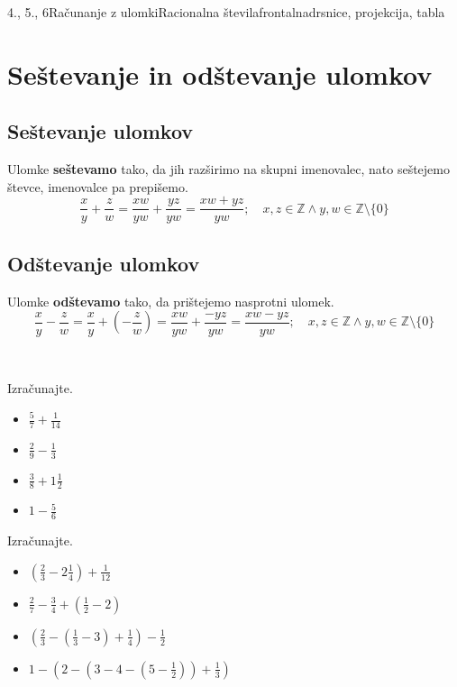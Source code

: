 \begin{priprava}{4., 5., 6}{}{Računanje z ulomki}{Racionalna števila}{frontalna}{drsnice, projekcija, tabla}

    \section{Seštevanje in odštevanje ulomkov}

        
    \subsection*{Seštevanje ulomkov}
        Ulomke \textbf{seštevamo} tako, da jih razširimo na skupni imenovalec, nato seštejemo števce, imenovalce pa prepišemo.
        $$\dfrac{x}{y}+\dfrac{z}{w}=\dfrac{xw}{yw}+\dfrac{yz}{yw}=\dfrac{xw+yz}{yw}; \quad x,z\in\mathbb{Z}\land y,w\in\mathbb{Z}\setminus\{0\} $$
    

    \subsection*{Odštevanje ulomkov}
        Ulomke \textbf{odštevamo} tako, da prištejemo nasprotni ulomek.
        $$\dfrac{x}{y}-\dfrac{z}{w}=\dfrac{x}{y}+\left(-\dfrac{z}{w}\right)=\dfrac{xw}{yw}+\dfrac{-yz}{yw}=\dfrac{xw-yz}{yw}; \quad x,z\in\mathbb{Z}\land y,w\in\mathbb{Z}\setminus\{0\} $$
    



    ~


\begin{multicols}{2}

    \begin{naloga}
        Izračunajte.
        \begin{itemize}
            \item $\frac{5}{7}+\frac{1}{14}$ 
            \item $\frac{2}{9}-\frac{1}{3}$ 
            \item $\frac{3}{8}+1\frac{1}{2}$ 
            \item $1-\frac{5}{6}$ 
        \end{itemize}
    \end{naloga}



    \begin{naloga}
        Izračunajte.
        \begin{itemize}
            \item $\left(\frac{2}{3}-2\frac{1}{4}\right)+\frac{1}{12}$ 
            \item $\frac{2}{7}-\frac{3}{4}+\left(\frac{1}{2}-2\right)$ 
            \item $\left(\frac{2}{3}-\left(\frac{1}{3}-3\right)+\frac{1}{4}\right)-\frac{1}{2}$ 
            \item $1-\left(2-\left(3-4-\left(5-\frac{1}{2}\right)\right)+\frac{1}{3}\right)$ 
        \end{itemize}
    \end{naloga}



\end{multicols}
\end{priprava}
